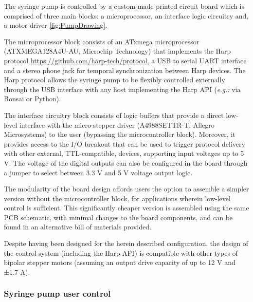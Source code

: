 The syringe pump is controlled by a custom-made printed circuit board which is comprised of three main blocks: a microprocessor, an interface logic circuitry and, a motor driver \cref{fig:PumpDrawing}.

The microprocessor block consists of an ATxmega microprocessor (ATXMEGA128A4U-AU, Microchip Technology) that implements the Harp protocol \url{https://github.com/harp-tech/protocol}, a USB to serial UART interface and a stereo phone jack for temporal synchronization between Harp devices. The Harp protocol allows the syringe pump to be flexibly controlled externally through the USB interface with any host implementing the Harp API (\textit{e.g.:} via Bonsai\citep{Lopes2015} or Python).

The interface circuitry block consists of logic buffers that provide a direct low-level interface with the micro-stepper driver (A4988SETTR-T, Allegro Microsystems) to the user (bypassing the microcontroller block). Moreover, it provides access to the I/O breakout that can be used to trigger protocol delivery with other external, TTL-compatible, devices, supporting input voltages up to 5 V. The voltage of the digital outputs can also be configured in the board through a jumper to select between 3.3 V and 5 V voltage output logic.

The modularity of the board design affords users the option to assemble a simpler version without the microcontroller block, for applications wherein low-level control is sufficient. This significantly cheaper version is assembled using the same PCB schematic, with minimal changes to the board components, and can be found in an alternative bill of materials provided.

Despite having been designed for the herein described configuration, the design of the control system (including the Harp API) is compatible with other types of bipolar stepper motors (assuming an output drive capacity of up to 12 V and ±1.7 A).

\subsubsection*{Syringe pump user control}

